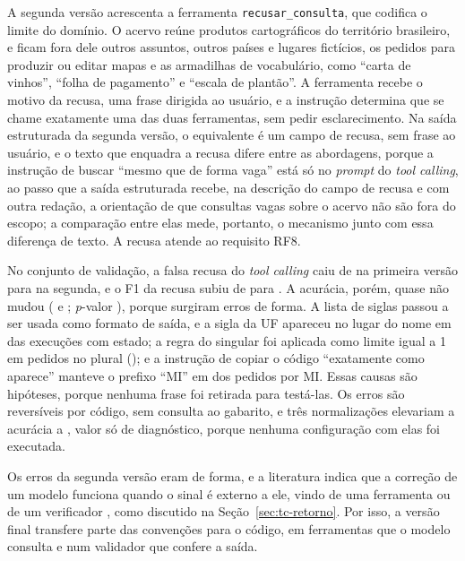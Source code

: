 A segunda versão acrescenta a ferramenta \texttt{recusar\_consulta}, que codifica o limite do domínio. O acervo reúne produtos cartográficos do território brasileiro, e ficam fora dele outros assuntos, outros países e lugares fictícios, os pedidos para produzir ou editar mapas e as armadilhas de vocabulário, como ``carta de vinhos'', ``folha de pagamento'' e ``escala de plantão''. A ferramenta recebe o motivo da recusa, uma frase dirigida ao usuário, e a instrução determina que se chame exatamente uma das duas ferramentas, sem pedir esclarecimento. Na saída estruturada da segunda versão, o equivalente é um campo de recusa, sem frase ao usuário, e o texto que enquadra a recusa difere entre as abordagens, porque a instrução de buscar ``mesmo que de forma vaga'' está só no \textit{prompt} do \textit{tool calling}, ao passo que a saída estruturada recebe, na descrição do campo de recusa e com outra redação, a orientação de que consultas vagas sobre o acervo não são fora do escopo; a comparação entre elas mede, portanto, o mecanismo junto com essa diferença de texto. A recusa atende ao requisito RF8.

No conjunto de validação, a falsa recusa do \textit{tool calling} caiu de  na primeira versão para  na segunda, e o F1 da recusa subiu de  para . A acurácia, porém, quase não mudou ( e ; \textit{p}-valor ), porque surgiram erros de forma. A lista de siglas passou a ser usada como formato de saída, e a sigla da UF apareceu no lugar do nome em  das execuções com estado; a regra do singular foi aplicada como limite igual a 1 em pedidos no plural (); e a instrução de copiar o código ``exatamente como aparece'' manteve o prefixo ``MI'' em  dos pedidos por MI. Essas causas são hipóteses, porque nenhuma frase foi retirada para testá-las. Os erros são reversíveis por código, sem consulta ao gabarito, e três normalizações elevariam a acurácia a , valor só de diagnóstico, porque nenhuma configuração com elas foi executada.

Os erros da segunda versão eram de forma, e a literatura indica que a correção de um modelo funciona quando o sinal é externo a ele, vindo de uma ferramenta ou de um verificador \cite{huang2024cannot, gou2024critic}, como discutido na Seção~\ref{sec:tc-retorno}. Por isso, a versão final transfere parte das convenções para o código, em ferramentas que o modelo consulta e num validador que confere a saída.

